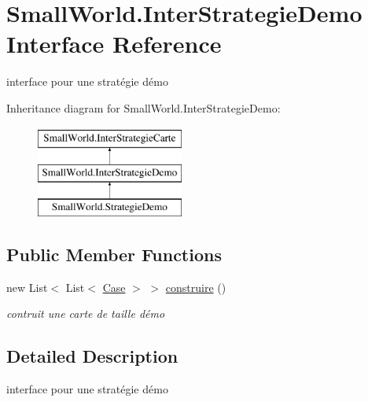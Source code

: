 \hypertarget{interface_small_world_1_1_inter_strategie_demo}{\section{Small\-World.\-Inter\-Strategie\-Demo Interface Reference}
\label{interface_small_world_1_1_inter_strategie_demo}
}


interface pour une stratégie démo  


Inheritance diagram for Small\-World.\-Inter\-Strategie\-Demo\-:\begin{figure}[H]
\begin{center}
\leavevmode
\includegraphics[height=3.000000cm]{interface_small_world_1_1_inter_strategie_demo}
\end{center}
\end{figure}
\subsection*{Public Member Functions}
\begin{DoxyCompactItemize}
\item 
new List$<$ List$<$ \hyperlink{class_small_world_1_1_case}{Case} $>$ $>$ \hyperlink{interface_small_world_1_1_inter_strategie_demo_ae408bd769e05f1147f4af7083667bc7f}{construire} ()
\begin{DoxyCompactList}\small\item\em contruit une carte de taille démo \end{DoxyCompactList}\end{DoxyCompactItemize}


\subsection{Detailed Description}
interface pour une stratégie démo 

